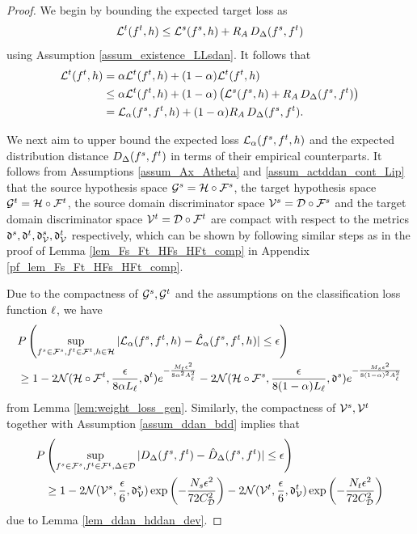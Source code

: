 \documentclass[review,supplement,onefignum,onetabnum]{siamonline250211}
\begin{document}
\begin{proof}

We begin by bounding the expected target loss as
%
\[
 \mathcal{L}^t(f^t, h) \leq \mathcal{L}^s (f^s, h) +  R_{A} \, D_{\Delta}(f^s, f^t)
\]
%
using Assumption \ref{assum_existence_LLsdan}. It follows that
%
\begin{equation}
\label{eq_Lt_Lw_RADA_ddan}
\begin{split}
\mathcal{L}^t(f^t, h) &= \alpha \mathcal{L}^t(f^t, h) +  (1-\alpha) \mathcal{L}^t(f^t, h) \\
	&\leq \alpha \mathcal{L}^t(f^t, h) +  (1-\alpha) \left( \mathcal{L}^s (f^s, h) + R_{A} \, D_{\Delta}(f^s, f^t) \right)\\
&= \mathcal{L}_{\alpha}(f^s, f^t, h)+ (1-\alpha) R_{A} \, D_{\Delta}(f^s, f^t) .
\end{split}
\end{equation}
%

We next aim to upper bound the expected loss $\mathcal{L}_{\alpha}(f^s, f^t, h)$ and the expected distribution distance $ D_{\Delta}(f^s, f^t) $ in terms of their empirical counterparts. It follows from Assumptions \ref{assum_Ax_Atheta} and \ref{assum_actddan_cont_Lip} that the source hypothesis space $\mathcal{G}^s=\mathcal{H} \circ \mathcal{F}^s$, the target hypothesis space $\mathcal{G}^t= \mathcal{H} \circ \mathcal{F}^t$, the source domain discriminator space $\mathcal{V}^s = \mathcal{D} \circ \mathcal{F}^s$ and the target domain discriminator space $\mathcal{V}^t = \mathcal{D} \circ \mathcal{F}^t$ are compact with respect to the metrics $\mathfrak{d}^s, \mathfrak{d}^t, \mathfrak{d}^s_{\mathcal{V}} , \mathfrak{d}^t_{\mathcal{V}} $ respectively, which can be shown by following similar steps as in the proof of Lemma \ref{lem_Fs_Ft_HFs_HFt_comp} in Appendix \ref{pf_lem_Fs_Ft_HFs_HFt_comp}.

Due to the compactness of $\mathcal{G}^s, \mathcal{G}^t$ and the assumptions on the classification loss function $\ell$, we have 
%
\begin{equation}
\label{eq_cons_lem_weight_loss_gen}
\begin{split}
&P\left (\sup_{f^s \in \mathcal{F}^s, f^t \in \mathcal{F}^t, h \in \mathcal{H}} |  \mathcal{L}_{\alpha}( f^s, f^t, h ) - \hat{\mathcal{L}}_{\alpha}( f^s,  f^t, h )   |  \leq \epsilon \right) \\
& \geq 1 - 2 \mathcal{N}( \mathcal{H} \circ \mathcal{F}^t, \frac{\epsilon}{8 \alpha L_\ell}, \mathfrak{d}^t) e^{-\frac{M_t \epsilon^2}{8 \alpha^2 A_\ell^2}} 
-2 \mathcal{N}( \mathcal{H} \circ \mathcal{F}^s, \frac{\epsilon}{8 (1-\alpha) L_\ell}, \mathfrak{d}^s) e^{-\frac{M_s \epsilon^2}{8 (1-\alpha)^2 A_\ell^2}}
\end{split}
\end{equation}
%
from Lemma \ref{lem:weight_loss_gen}. Similarly, the compactness of $\mathcal{V}^s, \mathcal{V}^t$ together with Assumption \ref{assum_ddan_bdd} implies that 
%
\begin{equation}
\label{eq_cons_lem_ddan_hhdan_dev}
\begin{split}
P & \left(
\sup_{f^s \in \mathcal{F}^s, f^t \in \mathcal{F}^t, \Delta \in \mathcal{D}} 
 |  D_{\Delta}(f^s, f^t)  - \hat{D}_{\Delta}(f^s, f^t)  | \leq  \epsilon
 \right ) \\
& \geq
 1 - 2 \mathcal{N}(\mathcal{V}^s, \frac{\epsilon}{6}, \mathfrak{d}^s_{\mathcal{V}} )  \exp \left( -\frac{N_s \epsilon^2}{72 {C^2_{\mathcal{D}}}} \right) 
- 2 \mathcal{N}(\mathcal{V}^t, \frac{\epsilon}{6}, \mathfrak{d}^t_{\mathcal{V}} ) \exp \left( -\frac{N_t \epsilon^2}{72 {C^2_{\mathcal{D}}}} \right) 
\end{split}
\end{equation}
%
due to Lemma \ref{lem_ddan_hddan_dev}. 


\end{proof}
\end{document}
